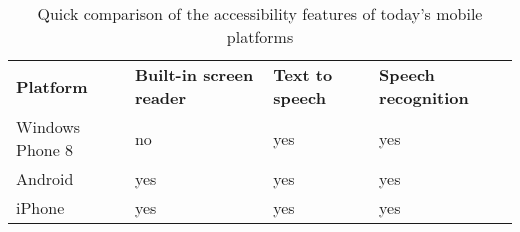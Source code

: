 \begin{table}[htbp]
  \centering
  \caption{Quick comparison of the accessibility features of today's mobile platforms}
  \label{tab:accbilityComparison}
 \renewcommand{\arraystretch}{1.2}
    \begin{tabularx}{\textwidth}{p{3cm}|X|X|X}
    \rowcolor{mygray}
    \textbf{Platform} & \textbf{Built-in screen reader} & \textbf{Text to speech} & \textbf{Speech recognition} \\
    Windows Phone 8 & no \footnotemark & yes & yes \\ \hline
    Android & yes & yes & yes \\ \hline
    iPhone & yes & yes & yes \\
    \end{tabularx}%
\end{table}%
